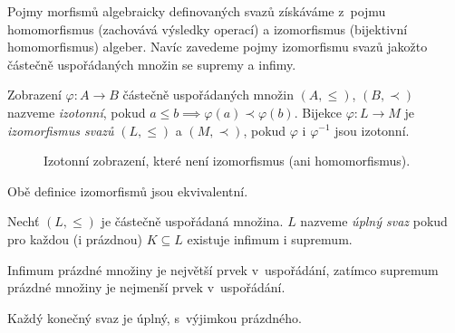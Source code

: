 Pojmy morfismů algebraicky definovaných svazů získáváme
z~pojmu homomorfismus (zachovává výsledky operací)
a izomorfismus (bijektivní homomorfismus) algeber. Navíc zavedeme pojmy
izomorfismu svazů jakožto částečně uspořádaných množin se supremy a infimy.

\begin{definition}
    Zobrazení $\varphi : A \to B$ částečně uspořádaných množin
    $(A, \leq)$, $(B, \prec)$ nazveme {\em izotonní},
    pokud $a \leq b \implies \varphi(a) \prec \varphi(b)$.
    Bijekce $\varphi : L \to M$ je {\em izomorfismus svazů}
    $(L, \leq)$ a $(M, \prec)$, pokud $\varphi$ i $\varphi^{-1}$ jsou
    izotonní.
\end{definition}

\begin{figure}[h!]
\centering
{}
\caption{Izotonní zobrazení, které není izomorfismus (ani homomorfismus).}
\end{figure}

\begin{claim}
    Obě definice izomorfismů jsou ekvivalentní.
\end{claim}

\begin{definition}
    Nechť $(L, \leq)$ je částečně uspořádaná množina.
    $L$ nazveme {\em úplný svaz} pokud pro každou (i prázdnou)
    $K \subseteq L$ existuje infimum i supremum.
\end{definition}

Infimum prázdné množiny je největší prvek v~uspořádání,
zatímco supremum prázdné množiny je nejmenší prvek v~uspořádání.

\begin{note}
    Každý konečný svaz je úplný, s~výjimkou prázdného.
\end{note}


